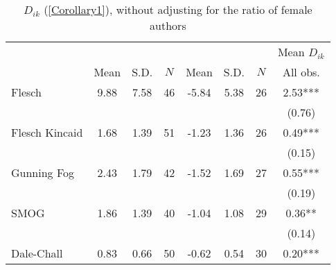 \begin{table}[H]
    \footnotesize
    \centering
    \begin{threeparttable}
        \caption{\(D_{ik}\) (\autoref{Corollary1}), without adjusting for the ratio of female authors}
        \label{table8_R}
        \begin{tabular}{p{3cm}S[table-format=3.3]@{}S[table-format=3.3]@{}S[table-format=3.2]@{}S[table-format=4.3]@{}S[table-format=3.3]@{}S[table-format=3.1]@{}S@{}}
            \toprule
            &&&{{Mean \(D_{ik}\)}}\\\cmidrule(lr){2-4}\cmidrule(lr){5-7}\cmidrule(lr){8-8}&{{Mean}}&{{S.D.}}&{{\(N\)}}&{{Mean}}&{{S.D.}}&{{\(N\)}}&{{All obs.}}\\
            \midrule
            Flesch                        &        9.88&        7.58&          46&       -5.84&        5.38&          26&        2.53***\\
                                          &            &            &            &            &            &            &      (0.76)   \\
            Flesch Kincaid                &        1.68&        1.39&          51&       -1.23&        1.36&          26&        0.49***\\
                                          &            &            &            &            &            &            &      (0.15)   \\
            Gunning Fog                   &        2.43&        1.79&          42&       -1.52&        1.69&          27&        0.55***\\
                                          &            &            &            &            &            &            &      (0.19)   \\
            SMOG                          &        1.86&        1.39&          40&       -1.04&        1.08&          29&        0.36** \\
                                          &            &            &            &            &            &            &      (0.14)   \\
            Dale-Chall                    &        0.83&        0.66&          50&       -0.62&        0.54&          30&        0.20***\\

\end{tabular}
\end{threeparttable}
\end{table}
